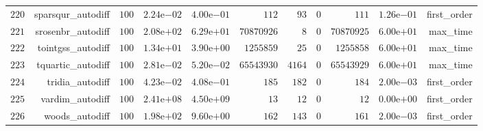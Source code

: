 \documentclass[varwidth=20cm,crop=true]{standalone}
\begin{document}
\begin{longtable}{rrrrrrrrrrr}
  \(   220\) & sparsqur\_autodiff & \(   100\) & \( 2.24\)e\(-02\) & \( 4.00\)e\(-01\) & \(   112\) & \(    93\) & \(     0\) & \(   111\) & \( 1.26\)e\(-01\) & first\_order \\
  \(   221\) & srosenbr\_autodiff & \(   100\) & \( 2.08\)e\(+02\) & \( 6.29\)e\(+01\) & \(70870926\) & \(     8\) & \(     0\) & \(70870925\) & \( 6.00\)e\(+01\) & max\_time \\
  \(   222\) & tointgss\_autodiff & \(   100\) & \( 1.34\)e\(+01\) & \( 3.90\)e\(+00\) & \(1255859\) & \(    25\) & \(     0\) & \(1255858\) & \( 6.00\)e\(+01\) & max\_time \\
  \(   223\) & tquartic\_autodiff & \(   100\) & \( 2.81\)e\(-02\) & \( 5.20\)e\(-02\) & \(65543930\) & \(  4164\) & \(     0\) & \(65543929\) & \( 6.00\)e\(+01\) & max\_time \\
  \(   224\) & tridia\_autodiff & \(   100\) & \( 4.23\)e\(-02\) & \( 4.08\)e\(-01\) & \(   185\) & \(   182\) & \(     0\) & \(   184\) & \( 2.00\)e\(-03\) & first\_order \\
  \(   225\) & vardim\_autodiff & \(   100\) & \( 2.41\)e\(+08\) & \( 4.50\)e\(+09\) & \(    13\) & \(    12\) & \(     0\) & \(    12\) & \( 0.00\)e\(+00\) & first\_order \\
  \(   226\) & woods\_autodiff & \(   100\) & \( 1.98\)e\(+02\) & \( 9.60\)e\(+00\) & \(   162\) & \(   143\) & \(     0\) & \(   161\) & \( 2.00\)e\(-03\) & first\_order \\\hline
\end{longtable}
\end{document}
